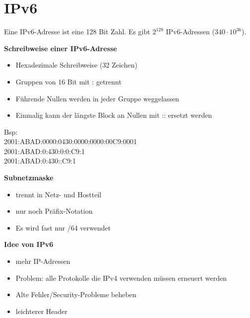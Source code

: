 \chapter{IPv6}
Eine IPv6-Adresse ist eine 128 Bit Zahl. Es gibt $2^{128}$ IPv6-Adressen ($340\cdot10^{36}$).

\textbf{Schreibweise einer IPv6-Adresse} \\
\begin{itemize}
	\item Hexadezimale Schreibweise (32 Zeichen)
	\item Gruppen von 16 Bit mit : getrennt
	\item Führende Nullen werden in jeder Gruppe weggelassen
	\item Einmalig kann der längste Block an Nullen mit :: ersetzt werden
\end{itemize}

Bsp: \\
2001:ABAD:0000:0430:0000:0000:00C9:0001 \\
2001:ABAD:0:430:0:0:C9:1 \\
2001:ABAD:0:430::C9:1

\textbf{Subnetzmaske}
\begin{itemize}
	\item trennt in Netz- und Hostteil 
	\item nur noch Präfix-Notation
	\item Es wird fast nur /64 verwendet
\end{itemize}

\textbf{Idee von IPv6}
\begin{itemize}
	\item mehr IP-Adressen
	\item Problem: alle Protokolle die IPv4 verwenden müssen erneuert werden
	\item Alte Fehler/Security-Probleme beheben
	\item leichterer Header
\end{itemize}

